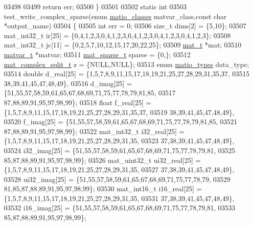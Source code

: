 \begin{DoxyCode}
{{{{{{{{{{{{{{{{{{{{{{{{{{{{{{{{{{{{{{{{{{{{{{{{{{{{{{{{{{{{03498 
03499     \textcolor{keywordflow}{return} err;
03500 \}
03501 
03502 \textcolor{keyword}{static} \textcolor{keywordtype}{int}
03503 test\_write\_complex\_sparse(\textcolor{keyword}{enum} \hyperlink{group___m_a_t_gad4d60ae7b709fc81bfd744fb4c857c40}{matio\_classes} matvar\_class,\textcolor{keyword}{const} \textcolor{keywordtype}{char} *output\_name)
03504 \{
03505     \textcolor{keywordtype}{int}    err = 0;
03506     \textcolor{keywordtype}{size\_t} dims[2] = \{5,10\};
03507     mat\_int32\_t  ir[25] = \{0,4,1,2,3,0,4,1,2,3,0,4,1,2,3,0,4,1,2,3,0,4,1,2,3\};
03508     mat\_int32\_t  jc[11] = \{0,2,5,7,10,12,15,17,20,22,25\};
03509     \hyperlink{struct__mat__t}{mat\_t} *mat;
03510     \hyperlink{group___m_a_t_structmatvar__t}{matvar\_t} *matvar;
03511     \hyperlink{group___m_a_t_structmat__sparse__t}{mat\_sparse\_t}  sparse = \{0,\};
03512     \hyperlink{group___m_a_t_structmat__complex__split__t}{mat\_complex\_split\_t} z = \{NULL,NULL\};
03513     \textcolor{keyword}{enum} \hyperlink{group___m_a_t_gacf7b3b879282b7ab3a51190e49bf3453}{matio\_types} data\_type;
03514     \textcolor{keywordtype}{double}    d\_real[25] = \{1,5,7,8,9,11,15,17,18,19,21,25,27,28,29,31,35,37,
03515                             38,39,41,45,47,48,49\},
03516               d\_imag[25] = \{51,55,57,58,59,61,65,67,68,69,71,75,77,78,79,81,85,
03517                             87,88,89,91,95,97,98,99\};
03518     \textcolor{keywordtype}{float}     f\_real[25] = \{1,5,7,8,9,11,15,17,18,19,21,25,27,28,29,31,35,37,
03519                             38,39,41,45,47,48,49\},
03520               f\_imag[25] = \{51,55,57,58,59,61,65,67,68,69,71,75,77,78,79,81,85,
03521                             87,88,89,91,95,97,98,99\};
03522     mat\_int32\_t i32\_real[25] = \{1,5,7,8,9,11,15,17,18,19,21,25,27,28,29,31,35,
03523                                 37,38,39,41,45,47,48,49\},
03524                 i32\_imag[25] = \{51,55,57,58,59,61,65,67,68,69,71,75,77,78,79,81,
03525                                 85,87,88,89,91,95,97,98,99\};
03526     mat\_uint32\_t ui32\_real[25] = \{1,5,7,8,9,11,15,17,18,19,21,25,27,28,29,31,35,
03527                                   37,38,39,41,45,47,48,49\},
03528                  ui32\_imag[25] = \{51,55,57,58,59,61,65,67,68,69,71,75,77,78,79,
03529                                   81,85,87,88,89,91,95,97,98,99\};
03530     mat\_int16\_t i16\_real[25] = \{1,5,7,8,9,11,15,17,18,19,21,25,27,28,29,31,35,
03531                                 37,38,39,41,45,47,48,49\},
03532                 i16\_imag[25] = \{51,55,57,58,59,61,65,67,68,69,71,75,77,78,79,81,
03533                                 85,87,88,89,91,95,97,98,99\};
}}}}}}}}}}}}}}}}}}}}}}}}}}}}}}}}}}}}}}}}}}}}}}}}}}}}}}}}}}}}
\end{DoxyCode}
